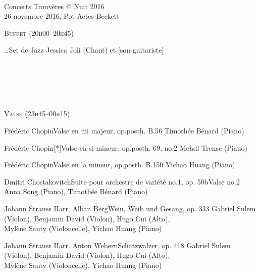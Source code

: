 \documentclass[a4paper,11pt,poets,durations]{ConcProg}
\begin{document}
{
\selectfont

~\\

\begin{programme}{
    Concerts Trouvères @ Nuit 2016
\\  {\normalsize 26 novembre 2016, Pot-Actes-Beckett}
}
~\\
\begin{center}
\textsc{Buffet (20h00--20h45)}
\end{center}
  \begin{part}[]
    \begin{composition}{\dots}{}{Set de Jazz}{}
      {\small Jessica Joli (Chant) et [son guitariste]}
    \end{composition}\\
~\\
~\\
~\\
\begin{center}
\textsc{Valse (23h45--00h15)}
\end{center}
    \begin{composition}{Frédéric Chopin}{}{Valse en mi majeur, op.posth. B.56}{}
      {\small Timothée Bénard (Piano)}
    \end{composition}
    \begin{composition}{Frédéric Chopin}{}{[*]Valse en si mineur, op.posth. 69, no.2}{}
      {\small Mehdi Trense (Piano)}
    \end{composition}
    \begin{composition}{Frédéric Chopin}{}{Valse en la mineur, op.posth. B.150}{}
      {\small Yichao Huang (Piano)}
    \end{composition}
    \begin{composition}{Dmitri Chostakovitch}{}{Suite pour orchestre de variété no.1, op. 50b}{Valse no.2}
      {\small Anna Song (Piano), Timothée Bénard (Piano)}
    \end{composition}
    \begin{composition}{Johann Strauss II}{arr. Alban Berg}{Wein, Weib und Gesang, op. 333}{}
      {\small Gabriel Sulem (Violon), Benjamin David (Violon), Hugo Cui (Alto),\\Mylène Sauty (Violoncelle), Yichao Huang (Piano)}
    \end{composition}
    \begin{composition}{Johann Strauss II}{arr. Anton Webern}{Schatzwalzer, op. 418}{}
      {\small Gabriel Sulem (Violon), Benjamin David (Violon), Hugo Cui (Alto),\\Mylène Sauty (Violoncelle), Yichao Huang (Piano)}

\end{composition}
\end{part}
\end{programme}}
\end{document}
